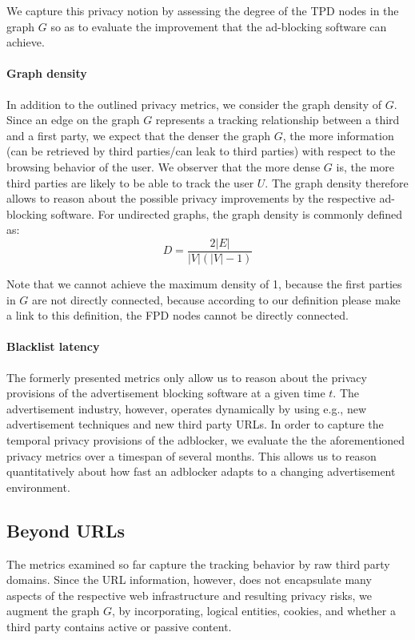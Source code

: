 \documentclass{sig-alternate}
\begin{document}
We capture this privacy notion by assessing the degree of the TPD nodes in the graph $G$ so as to evaluate the improvement that the ad-blocking software can achieve.

\paragraph{Graph density}
In addition to the outlined privacy metrics, we consider the graph density of $G$. Since an edge on the graph $G$ represents a tracking relationship between a third and a first party, we expect that the denser the graph $G$, the more information (can be retrieved by third parties/can leak to third parties) with respect to the browsing behavior of the user. We observer that the more dense $G$ is, the more third parties are likely to be able to track the user $U$. The graph density therefore allows to reason about the possible privacy improvements by the respective ad-blocking software. For undirected graphs, the graph density is commonly defined as:
\begin{equation}
D = \frac{2 |E|}{|V|(|V|-1)}
\end{equation}

Note that we cannot achieve the maximum density of 1, because the first parties in $G$ are not directly connected, because according to our definition {\color{red}please make a link to this definition}, the FPD nodes cannot be directly connected.

\paragraph{Blacklist latency}
The formerly presented metrics only allow us to reason about the privacy provisions of the advertisement blocking software at a given time $t$. The advertisement industry, however, operates dynamically by using e.g., new advertisement techniques and new third party URLs. In order to capture the temporal privacy provisions of the adblocker, we evaluate the the aforementioned privacy metrics over a timespan of several months. This allows us to reason quantitatively about how fast an adblocker adapts to a changing advertisement environment.

\subsection{Beyond URLs}
The metrics examined so far capture the tracking behavior by raw third party domains. Since the URL information, however, does not encapsulate many aspects of the respective web infrastructure and resulting privacy risks, we augment the graph $G$, by incorporating, logical entities, cookies, and whether a third party contains active or passive content.
\end{document}

